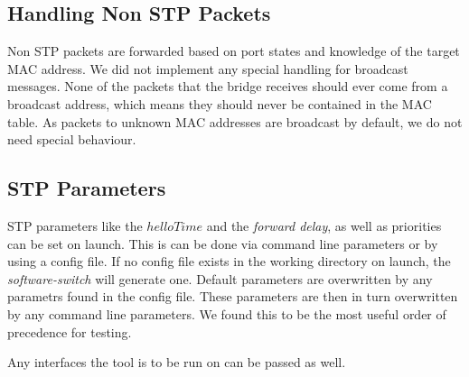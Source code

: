 \subsection{Handling Non STP Packets}
Non STP packets are forwarded based on port states and knowledge of the target MAC address.
We did not implement any special handling for broadcast messages.
None of the packets that the bridge receives should ever come from a broadcast address, which means they should never be contained in the MAC table.
As packets to unknown MAC addresses are broadcast by default, we do not need special behaviour.


\subsection{STP Parameters}
STP parameters like the $helloTime$ and the \textit{forward delay}, as well as priorities can be set on launch.
This is can be done via command line parameters or by using a config file.
If no config file exists in the working directory on launch, the \textit{software-switch} will generate one.
Default parameters are overwritten by any parametrs found in the config file.
These parameters are then in turn overwritten by any command line parameters.
We found this to be the most useful order of precedence for testing.

Any interfaces the tool is to be run on can be passed as well.

